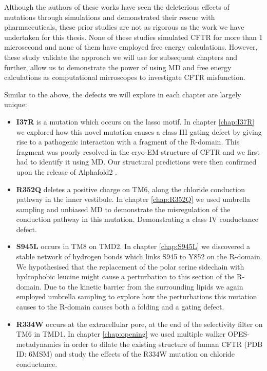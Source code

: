 Although the authors of these works have seen the deleterious effects of mutations through simulations and demonstrated their rescue with pharmaceuticals, these prior studies are not as rigorous as the work we have undertaken for this thesis. None of these studies simulated CFTR for more than 1 microsecond and none of them have employed free energy calculations. However, these study validate the approach we will use for subsequent chapters and further, allow us to demonstrate the power of using MD and free energy calculations as computational microscopes to investigate CFTR misfunction. 

Similar to the above, the defects we will explore in each chapter are largely unique: 

\begin{itemize}
	\item \textbf{I37R} is a mutation which occurs on the lasso motif. In chapter \ref{chap:I37R} we explored how this novel mutation causes a class III gating defect by giving rise to a pathogenic interaction with a fragment of the R-domain. This fragment was poorly resolved in the cryo-EM structure of CFTR and we first had to identify it using MD. Our structural predictions were then confirmed upon the release of Alphafold2 \cite{jumper2021}.  

	\item \textbf{R352Q} deletes a positive charge on TM6, along the chloride conduction pathway in the inner vestibule. In chapter \ref{chap:R352Q} we used umbrella sampling and unbiased MD to demonstrate the misregulation of the conduction pathway in this mutation. Demonstrating a class IV conductance defect. 

	\item \textbf{S945L} occurs in TM8 on TMD2. In chapter \ref{chap:S945L} we discovered a stable network of hydrogen bonds which links S945 to Y852 on the R-domain. We hypothesised that the replacement of the polar serine sidechain with hydrophobic leucine might cause a perturbation to this section of the R-domain. Due to the kinetic barrier from the surrounding lipids we again employed umbrella sampling to explore how the perturbations this mutation causes to the R-domain causes both a folding and a gating defect.

	\item \textbf {R334W} occurs at the extracellular pore, at the end of the selectivity filter on TM6 in TMD1. In chapter \ref{chap:opening} we used multiple walker OPES-metadynamics in order to dilate the existing structure of human CFTR (PDB ID: 6MSM) and study the effects of the R334W mutation on chloride conductance.

\end{itemize} 


